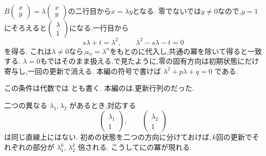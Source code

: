 $B\begin{pmatrix}x\\y\end{pmatrix}=\lambda\begin{pmatrix}x\\y\end{pmatrix}$の二行目から$x=\lambda y$となる.
零でないでは$y\ne0$なので,$y=1$にそろえると$\begin{pmatrix}\lambda\\1\end{pmatrix}$になる.一行目から
\[
  s\lambda+t=\lambda^2,
  \qquad
  \lambda^2-s\lambda-t=0
\]
を得る.
これは$\lambda\ne0$なら,$a_n=\lambda^n$をもとのに代入し,共通の冪を除いて得ると一致する.
$\lambda=0$もではそのまま扱える.で見たように,零の固有方向は初期状態にだけ寄与し,一回の更新で消える.
本編の符号で書けば $\lambda^2+p\lambda+q=0$ である.

この条件は代数では
\BookMathLayout{\[
  \det(\lambda I-B)
  =
  \det\begin{pmatrix}\lambda-s&-t\\-1&\lambda\end{pmatrix}
  =\lambda^2-s\lambda-t=0
\]}{
\[
\begin{aligned}
\det(\lambda I-B)&=\det\begin{pmatrix}\lambda-s&-t\\-1&\lambda\end{pmatrix}\\
&=\lambda^2-s\lambda-t=0
\end{aligned}
\]
}
とも書く.
本編のは,更新行列のだった.

二つの異なる $\lambda_1,\lambda_2$ があるとき,対応する
\[
  \begin{pmatrix}\lambda_1\\1\end{pmatrix},
  \qquad
  \begin{pmatrix}\lambda_2\\1\end{pmatrix}
\]
は同じ直線上にはない.
初めの状態を二つの方向に分けておけば,\,$k$回の更新でそれぞれの部分が $\lambda_1^k,\,\lambda_2^k$ 倍される.
こうしてにの冪が現れる.

